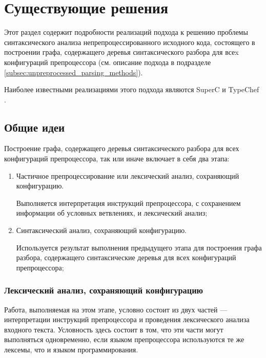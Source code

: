 \clearpage

\section{Существующие решения}

Этот раздел содержит подробности реализаций подхода к решению проблемы синтаксического анализа непрепроцессированного исходного кода, состоящего в построении графа, содержащего деревья синтаксического разбора для всеx конфигураций препроцессора (см. описание подхода в подразделе \ref{subsec:unpreprocessed_parsing_methods}).

Наиболее известными реализациями этого подхода являются SuperC \cite{superc} и TypeChef \cite{typechef}.

\subsection{Общие идеи}
\label{subsec:commonideas}

Построение графа, содержащего деревья синтаксического разбора для всех конфигураций препроцессора, так или иначе включает в себя два этапа:

\begin{enumerate}

\item Частичное препроцессирование или лексический анализ, сохраняющий конфигурацию.

Выполняется интерпретация инструкций препроцессора, с сохранением информации об условных ветвлениях, и лексический анализ;
\item Синтаксический анализ, сохраняющий конфигурацию.

Используется результат выполнения предыдущего этапа для построения графа разбора, содержащего синтаксические деревья для всех конфигураций препроцессора;

\end{enumerate} 

\subsubsection{Лексический анализ, сохраняющий конфигурацию}
\label{subsubsec:configurationpreservinglexing}

Работа, выполняемая на этом этапе, условно состоит из двух частей --- интерпретации инструкций препроцессора и проведения лексического анализа входного текста. Условность здесь состоит в том, что эти части могут выполняться одновременно, если языком препроцессора используются те же лексемы, что и языком программирования.

